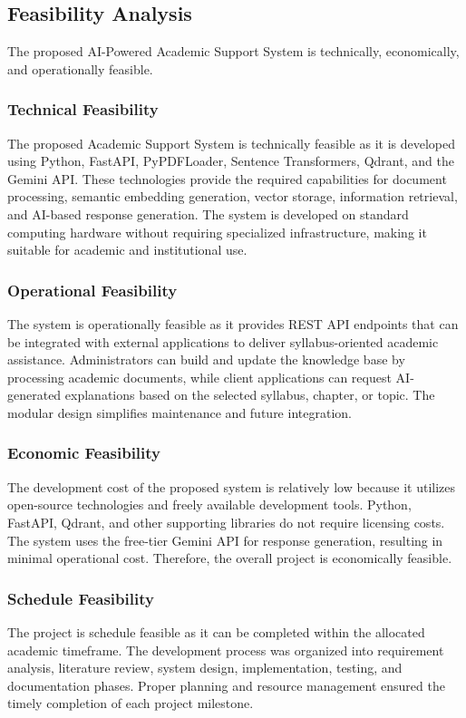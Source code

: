 \subsection{Feasibility Analysis}
The proposed AI-Powered Academic Support System is technically, economically, and operationally feasible.

\subsubsection{Technical Feasibility}
The proposed Academic Support System is technically feasible as it is developed using Python, FastAPI, PyPDFLoader, Sentence Transformers, Qdrant, and the Gemini API. These technologies provide the required capabilities for document processing, semantic embedding generation, vector storage, information retrieval, and AI-based response generation. The system is developed on standard computing hardware without requiring specialized infrastructure, making it suitable for academic and institutional use. \par

\subsubsection{Operational Feasibility}
The system is operationally feasible as it provides REST API endpoints that can be  integrated with external applications to deliver syllabus-oriented academic assistance.  Administrators can build and update the knowledge base by processing academic documents, while client applications can request AI-generated explanations based on the  selected syllabus, chapter, or topic. The modular design simplifies maintenance and future  integration. \par

\subsubsection{Economic Feasibility}
The development cost of the proposed system is relatively low because it utilizes open-source technologies and freely available development tools. Python, FastAPI, Qdrant, and other supporting libraries do not require licensing costs. The system uses the free-tier Gemini API for response generation, resulting in minimal operational cost. Therefore, the overall project is economically feasible. \par

\subsubsection{Schedule Feasibility}
The project is schedule feasible as it can be completed within the allocated academic timeframe. The development process was organized into requirement analysis, literature review, system design, implementation, testing, and documentation phases. Proper planning and resource management ensured the timely completion of each project milestone. \par


